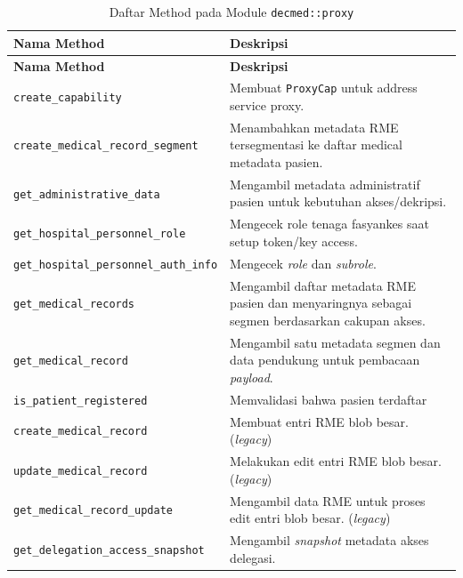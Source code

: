 \begin{longtable}{|Y{0.45\textwidth}|Y{0.47\textwidth}|}
	\caption{Daftar Method pada Module \texttt{decmed::proxy}}
	\label{tab:daftar-method-decmed-proxy}                                                                                                          \\
	\hline
	\textbf{Nama Method}                          & \textbf{Deskripsi}                                                                              \\
	\hline
	\endfirsthead
	\hline
	\textbf{Nama Method}                          & \textbf{Deskripsi}                                                                              \\
	\hline
	\endhead

	\texttt{create\_capability}                   & Membuat \texttt{ProxyCap} untuk address service proxy.                                          \\ \hline
	\texttt{create\_medical\_record\_segment}     & Menambahkan metadata RME tersegmentasi ke daftar medical metadata pasien.                       \\ \hline
	\texttt{get\_administrative\_data}            & Mengambil metadata administratif pasien untuk kebutuhan akses/dekripsi.                         \\ \hline
	\texttt{get\_hospital\_personnel\_role}       & Mengecek role tenaga fasyankes saat setup token/key access.                                     \\ \hline
	\texttt{get\_hospital\_personnel\_auth\_info} & Mengecek \textit{role} dan \textit{subrole}.                                                    \\ \hline
	\texttt{get\_medical\_records}                & Mengambil daftar metadata RME pasien dan menyaringnya sebagai segmen berdasarkan cakupan akses. \\ \hline
	\texttt{get\_medical\_record}                 & Mengambil satu metadata segmen dan data pendukung untuk pembacaan \textit{payload}.             \\ \hline
	\texttt{is\_patient\_registered}              & Memvalidasi bahwa pasien terdaftar                                                              \\ \hline
	\texttt{create\_medical\_record}              & Membuat entri RME blob besar. (\textit{legacy})                                                 \\ \hline
	\texttt{update\_medical\_record}              & Melakukan edit entri RME blob besar. (\textit{legacy})                                          \\ \hline
	\texttt{get\_medical\_record\_update}         & Mengambil data RME untuk proses edit entri blob besar. (\textit{legacy})                        \\ \hline
	\texttt{get\_delegation\_access\_snapshot}    & Mengambil \textit{snapshot} metadata akses delegasi.                                            \\ \hline
\end{longtable}